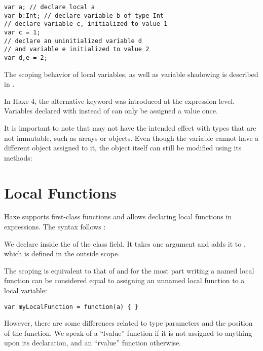 \begin{lstlisting}
var a; // declare local a
var b:Int; // declare variable b of type Int
// declare variable c, initialized to value 1
var c = 1;
// declare an uninitialized variable d
// and variable e initialized to value 2
var d,e = 2;
\end{lstlisting}

The scoping behavior of local variables, as well as variable shadowing is described in .


In Haxe 4, the alternative keyword  was introduced at the expression level. Variables declared with  instead of  can only be assigned a value once.


It is important to note that  may not have the intended effect with types that are not immutable, such as arrays or objects. Even though the variable cannot have a different object assigned to it, the object itself can still be modified using its methods:



\section{Local Functions}
\label{expression-function}

Haxe supports first-class functions and allows declaring local functions in expressions. The syntax follows :


We declare  inside the  of the  class field. It takes one argument  and adds it to , which is defined in the outside scope.

The scoping is equivalent to that of  and for the most part writing a named local function can be considered equal to assigning an unnamed local function to a local variable:

\begin{lstlisting}
var myLocalFunction = function(a) { }
\end{lstlisting}

However, there are some differences related to type parameters and the position of the function. We speak of a ``lvalue'' function if it is not assigned to anything upon its declaration, and an ``rvalue'' function otherwise.

